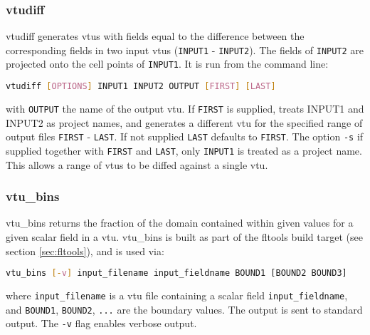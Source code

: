 
\subsubsection{vtudiff}
\label{sec:vtudiff}

vtudiff generates vtus with fields equal to the difference between the corresponding fields in two input vtus (\lstinline[language = Bash]+INPUT1+ - \lstinline[language = Bash]+INPUT2+). The fields of \lstinline[language = Bash]+INPUT2+ are projected onto the cell points of \lstinline[language = Bash]+INPUT1+. It is run from the command line:
\begin{lstlisting}[language = Bash]
vtudiff [OPTIONS] INPUT1 INPUT2 OUTPUT [FIRST] [LAST]
\end{lstlisting}
with \lstinline[language = Bash]+OUTPUT+ the name of the output vtu. If \lstinline[language = Bash]+FIRST+ is supplied, treats INPUT1 and INPUT2 as project names, and generates a different vtu for the specified range of output files \lstinline[language = Bash]+FIRST+ - \lstinline[language = Bash]+LAST+. If not supplied \lstinline[language = Bash]+LAST+ defaults to \lstinline[language = Bash]+FIRST+. The option \lstinline[language = Bash]+-s+ if supplied together with \lstinline[language = Bash]+FIRST+ and \lstinline[language = Bash]+LAST+, only \lstinline[language = Bash]+INPUT1+ is treated as a project name. This allows a range of vtus to be diffed against a single vtu.


\subsubsection{vtu\_bins}
\label{sec:vtu_bins}

vtu\_bins returns the fraction of the domain contained within given values
for a given scalar field in a vtu. vtu\_bins is built as part of the fltools
build target (see section \ref{sec:fltools}), and is used via:

\begin{lstlisting}[language = Bash]
vtu_bins [-v] input_filename input_fieldname BOUND1 [BOUND2 BOUND3]
\end{lstlisting}

where \lstinline[language = Bash]+input_filename+ is a vtu file containing a scalar
field \lstinline[language = Bash]+input_fieldname+, and
\lstinline[language = Bash]+BOUND1+, \lstinline[language = Bash]+BOUND2+,
\lstinline[language = Bash]+...+ are the boundary values. The output is sent to
standard output. The \lstinline[language = Bash]+-v+ flag enables verbose output.

